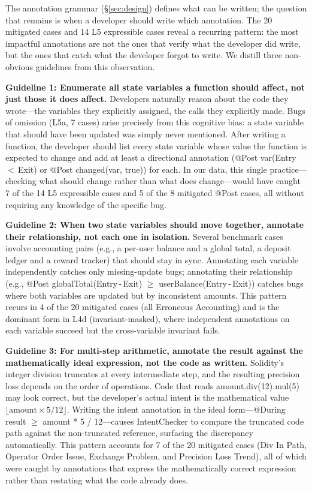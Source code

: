 \documentclass[pdflatex,sn-basic]{sn-jnl}%
\theoremstyle{thmstyleone}%
\theoremstyle{thmstyletwo}%
\theoremstyle{thmstylethree}%
\begin{document}
The annotation grammar (§\ref{sec:design}) defines what can be written; the question that remains is when a developer should write which annotation.
The 20 mitigated cases and 14 L5 expressible cases reveal a recurring pattern: the most impactful annotations are not the ones that verify what the developer did write, but the ones that catch what the developer forgot to write.
We distill three non-obvious guidelines from this observation.

\smallskip
\noindent\textbf{Guideline 1: Enumerate all state variables a function should affect, not just those it does affect.}
Developers naturally reason about the code they wrote---the variables they explicitly assigned, the calls they explicitly made.
Bugs of omission (L5a, 7 cases) arise precisely from this cognitive bias: a state variable that should have been updated was simply never mentioned.
After writing a function, the developer should list every state variable whose value the function is expected to change and add at least a directional annotation (@Post var(Entry\,$<$\,Exit) or @Post changed(var, true)) for each.
In our data, this single practice---checking what should change rather than what does change---would have caught 7 of the 14 L5 expressible cases and 5 of the 8 mitigated @Post cases, all without requiring any knowledge of the specific bug.

\smallskip
\noindent\textbf{Guideline 2: When two state variables should move together, annotate their relationship, not each one in isolation.}
Several benchmark cases involve accounting pairs (e.g., a per-user balance and a global total, a deposit ledger and a reward tracker) that should stay in sync.
Annotating each variable independently catches only missing-update bugs; annotating their relationship (e.g., @Post globalTotal(Entry\,-\,Exit) $\geq$ userBalance(Entry\,-\,Exit)) catches bugs where both variables are updated but by inconsistent amounts.
This pattern recurs in 4 of the 20 mitigated cases (all Erroneous Accounting) and is the dominant form in L4d (invariant-masked), where independent annotations on each variable succeed but the cross-variable invariant fails.

\smallskip
\noindent\textbf{Guideline 3: For multi-step arithmetic, annotate the result against the mathematically ideal expression, not the code as written.}
Solidity's integer division truncates at every intermediate step, and the resulting precision loss depends on the order of operations.
Code that reads amount.div(12).mul(5) may look correct, but the developer's actual intent is the mathematical value $\lfloor\text{amount} \times 5 / 12\rfloor$.
Writing the intent annotation in the ideal form---@During result $\geq$ amount * 5 / 12---causes IntentChecker to compare the truncated code path against the non-truncated reference, surfacing the discrepancy automatically.
This pattern accounts for 7 of the 20 mitigated cases (Div In Path, Operator Order Issue, Exchange Problem, and Precision Loss Trend), all of which were caught by annotations that express the mathematically correct expression rather than restating what the code already does.
\end{document}
